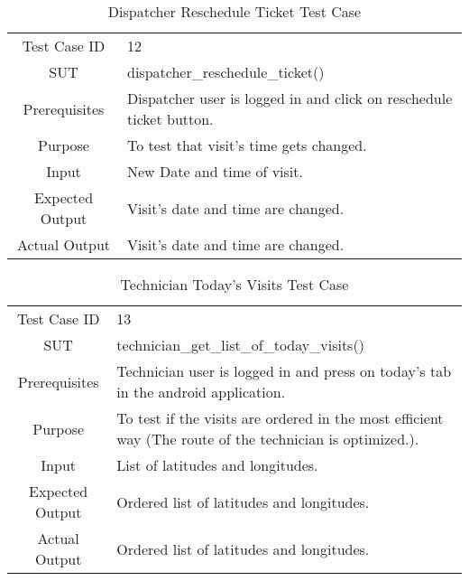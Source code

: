 	\begin{table}[H]
		\centering
		\renewcommand{\arraystretch}{1.5}
		\begin{tabular}[t]{ c  m{10cm} }
			Test Case ID & 12  \\
			SUT & dispatcher\_reschedule\_ticket() \\
			Prerequisites & Dispatcher user is logged in and click on reschedule ticket button. \\
			Purpose & To test that visit's time gets changed. \\
			Input & New Date and time of visit. \\
			Expected Output & Visit's date and time are changed. \\
			Actual Output & Visit's date and time are changed. \\
		\end{tabular}
		\caption{Dispatcher Reschedule Ticket Test Case}
		\renewcommand{\arraystretch}{1.0}
	\end{table}
	
	\begin{table}[H]
		\centering
		\renewcommand{\arraystretch}{1.5}
		\begin{tabular}[t]{ c  m{10cm} }
			Test Case ID & 13  \\
			SUT & technician\_get\_list\_of\_today\_visits() \\
			Prerequisites & Technician user is logged in and press on today's tab in the android application. \\
			Purpose & To test if the visits are ordered in the most efficient way (The route of the technician is optimized.). \\
			Input & List of latitudes and longitudes. \\
			Expected Output & Ordered list of latitudes and longitudes. \\
			Actual Output & Ordered list of latitudes and longitudes. \\
		\end{tabular}
		\caption{Technician Today's Visits Test Case}
		\renewcommand{\arraystretch}{1.0}
	\end{table}
	
